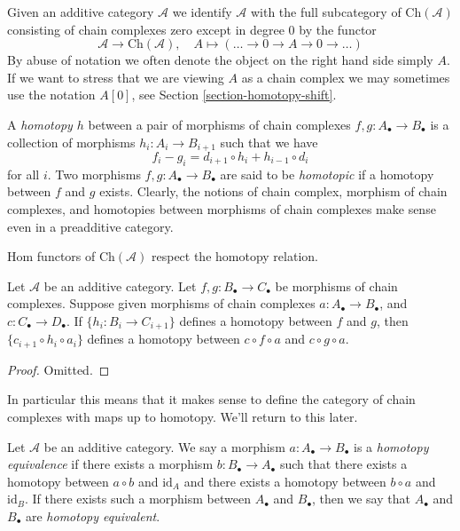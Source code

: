 \medskip\noindent
Given an additive category $\mathcal{A}$ we
identify $\mathcal{A}$
with the full subcategory of
$\text{Ch}(\mathcal{A})$ consisting
of chain complexes zero except in degree $0$
by the functor
$$
\mathcal{A} \longrightarrow
\text{Ch}(\mathcal{A}),\quad
A \longmapsto (\ldots \to 0 \to A \to 0 \to
\ldots)
$$
By abuse of notation we often denote the
object on the right hand side
simply $A$. If we want to stress that we are
viewing $A$ as a chain
complex we may sometimes use the notation
$A[0]$, see
Section \ref{section-homotopy-shift}.

\medskip\noindent
A {\it homotopy $h$} between a pair of
morphisms
of chain complexes $f, g : A_\bullet \to
B_\bullet$
is a collection of morphisms $h_i : A_i \to
B_{i + 1}$
such that we have
$$
f_i - g_i = d_{i + 1} \circ h_i + h_{i - 1}
\circ d_i
$$
for all $i$.
Two morphisms $f, g : A_\bullet \to
B_\bullet$ are
said to be {\it homotopic} if a homotopy
between $f$
and $g$ exists.
Clearly, the notions of chain complex,
morphism of
chain complexes, and homotopies between
morphisms of chain complexes
make sense even in a preadditive category.

\begin{lemma}
\label{lemma-compose-homotopy}
\begin{slogan}
Hom functors of $\text{Ch}(\mathcal{A})$
respect the homotopy relation.
\end{slogan}
Let $\mathcal{A}$ be an additive category.
Let $f, g : B_\bullet \to C_\bullet$ be
morphisms
of chain complexes. Suppose given morphisms
of chain
complexes $a : A_\bullet \to B_\bullet$, and
$c : C_\bullet \to D_\bullet$.
If $\{h_i : B_i \to C_{i + 1}\}$ defines a
homotopy
between $f$ and $g$, then $\{c_{i + 1} \circ
h_i \circ a_i\}$
defines a homotopy between $c \circ f \circ
a$ and
$c \circ g \circ a$.
\end{lemma}

\begin{proof}
Omitted.
\end{proof}

\noindent
In particular this means that it makes sense
to define
the category of chain complexes with maps up
to homotopy.
We'll return to this later.

\begin{definition}
\label{definition-homotopy-equivalent}
Let $\mathcal{A}$ be an additive category.
We say a morphism $a : A_\bullet \to
B_\bullet$
is a {\it homotopy equivalence} if there
exists
a morphism $b : B_\bullet \to A_\bullet$
such that there exists a homotopy between
$a \circ b$ and $\text{id}_A$
and there exists a homotopy between $b \circ
a$ and $\text{id}_B$.
If there exists such a morphism between
$A_\bullet$ and $B_\bullet$, then
we say that $A_\bullet$ and $B_\bullet$ are
{\it homotopy equivalent}.
\end{definition}

